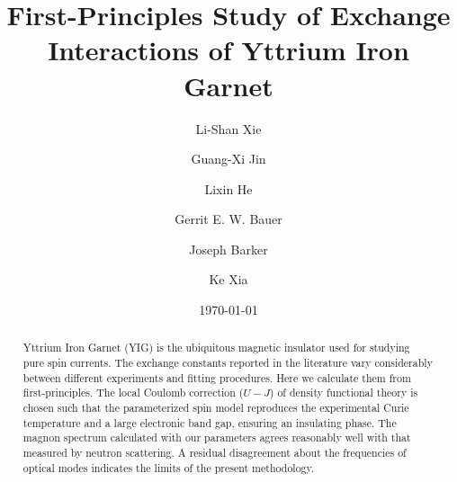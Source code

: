 \documentclass[aps,pre,reprint,superscriptaddress,longbibliography]{revtex4-1}
\begin{document}
\title{First-Principles Study of Exchange Interactions of Yttrium Iron Garnet}

\author{Li-Shan Xie}
\author{Guang-Xi Jin}
\author{Lixin He}
\author{Gerrit E. W. Bauer} 
\author{Joseph Barker}
\author{Ke Xia}

\date{\today}

\begin{abstract}
Yttrium Iron Garnet (YIG) is the ubiquitous magnetic insulator used for  studying pure spin currents. The exchange constants reported in the literature vary considerably between different experiments and fitting procedures. Here we calculate them from first-principles. The local Coulomb correction ($U-J$) of density functional theory is chosen such that the parameterized spin model reproduces the experimental Curie temperature and a large electronic band gap, ensuring an insulating phase. The magnon spectrum calculated with our parameters agrees reasonably well with that measured by neutron scattering. A residual disagreement about the frequencies of optical modes indicates the limits of the present methodology.
\end{abstract}

\pacs{}

\maketitle
\end{document}
